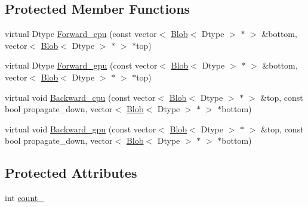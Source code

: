 \subsection*{Protected Member Functions}
\begin{DoxyCompactItemize}
\item 
virtual Dtype \hyperlink{classcaffe_1_1_split_layer_acf59ddcda276674b1b315cfc0c48c861}{Forward\+\_\+cpu} (const vector$<$ \hyperlink{classcaffe_1_1_blob}{Blob}$<$ Dtype $>$ $\ast$ $>$ \&bottom, vector$<$ \hyperlink{classcaffe_1_1_blob}{Blob}$<$ Dtype $>$ $\ast$ $>$ $\ast$top)
\item 
virtual Dtype \hyperlink{classcaffe_1_1_split_layer_a846e3484a6db332c52f38e70e673a5b8}{Forward\+\_\+gpu} (const vector$<$ \hyperlink{classcaffe_1_1_blob}{Blob}$<$ Dtype $>$ $\ast$ $>$ \&bottom, vector$<$ \hyperlink{classcaffe_1_1_blob}{Blob}$<$ Dtype $>$ $\ast$ $>$ $\ast$top)
\item 
virtual void \hyperlink{classcaffe_1_1_split_layer_ae9ef9d789fe7225af123010400b44100}{Backward\+\_\+cpu} (const vector$<$ \hyperlink{classcaffe_1_1_blob}{Blob}$<$ Dtype $>$ $\ast$ $>$ \&top, const bool propagate\+\_\+down, vector$<$ \hyperlink{classcaffe_1_1_blob}{Blob}$<$ Dtype $>$ $\ast$ $>$ $\ast$bottom)
\item 
virtual void \hyperlink{classcaffe_1_1_split_layer_a22b01622ac43b4a8a4dbbd893f25ae32}{Backward\+\_\+gpu} (const vector$<$ \hyperlink{classcaffe_1_1_blob}{Blob}$<$ Dtype $>$ $\ast$ $>$ \&top, const bool propagate\+\_\+down, vector$<$ \hyperlink{classcaffe_1_1_blob}{Blob}$<$ Dtype $>$ $\ast$ $>$ $\ast$bottom)
\end{DoxyCompactItemize}
\subsection*{Protected Attributes}
\begin{DoxyCompactItemize}
\item 
int \hyperlink{classcaffe_1_1_split_layer_a61d5ab69fcee07756a4a4655b33f3f75}{count\+\_\+}
\end{DoxyCompactItemize}



